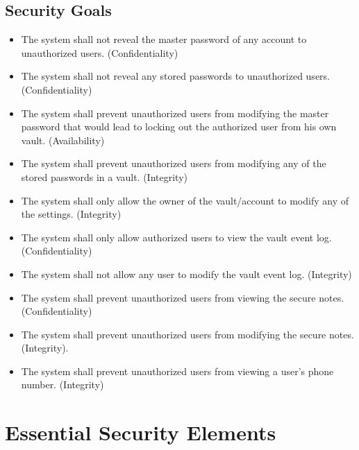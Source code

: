 \documentclass{article}
\begin{document}
\subsection{Security Goals}
\label{sub:security_goals}
\begin{itemize}
  \item The system shall not reveal the master password of any account to unauthorized users. (Confidentiality)
  \item The system shall not reveal any stored passwords to unauthorized users. (Confidentiality)
  \item The system shall prevent unauthorized users from modifying the master password that would lead to locking out the authorized user from his own vault. (Availability)
  \item The system shall prevent unauthorized users from modifying any of the stored passwords in a vault. (Integrity)
  \item The system shall only allow the owner of the vault/account to modify any of the settings. (Integrity)
  \item The system shall only allow authorized users to view the vault event log. (Confidentiality)
  \item The system shall not allow any user to modify the vault event log. (Integrity)
  \item The system shall prevent unauthorized users from viewing the secure notes. (Confidentiality)
  \item The system shall prevent unauthorized users from modifying the secure notes. (Integrity).
  \item The system shall prevent unauthorized users from viewing a user's phone number. (Integrity)
\end{itemize}

\section{Essential Security Elements}
\label{sec:essential_security_elements}
\end{document}
